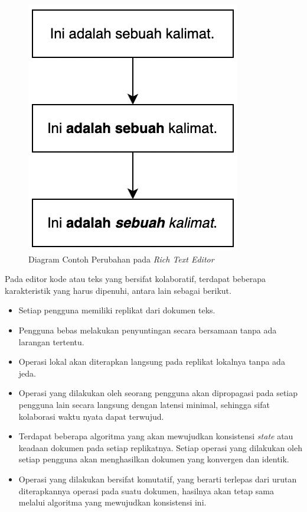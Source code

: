 \begin{figure}
    \centering
    \includegraphics[scale=0.8]{assets/skripsi/richtext.jpg}
    \caption{Diagram Contoh Perubahan pada \textit{Rich Text Editor}}
    \label{fig:2:richtext}
\end{figure}

Pada editor kode atau teks yang bersifat kolaboratif, terdapat beberapa karakteristik yang harus dipenuhi, antara lain sebagai berikut.

\begin{itemize} [noitemsep]
    \item Setiap pengguna memiliki replikat dari dokumen teks.
    \item Pengguna bebas melakukan penyuntingan secara bersamaan tanpa ada larangan tertentu.
    \item Operasi lokal akan diterapkan langsung pada replikat lokalnya tanpa ada jeda.
    \item Operasi yang dilakukan oleh seorang pengguna akan dipropagasi pada setiap pengguna lain secara langsung dengan latensi minimal, sehingga sifat kolaborasi waktu nyata dapat terwujud.
    \item Terdapat beberapa algoritma yang akan mewujudkan konsistensi \textit{state} atau keadaan dokumen pada setiap replikatnya. Setiap operasi yang dilakukan oleh setiap pengguna akan menghasilkan dokumen yang konvergen dan identik.
    \item Operasi yang dilakukan bersifat komutatif, yang berarti terlepas dari urutan diterapkannya operasi pada suatu dokumen, hasilnya akan tetap sama melalui algoritma yang mewujudkan konsistensi ini.
\end{itemize}

